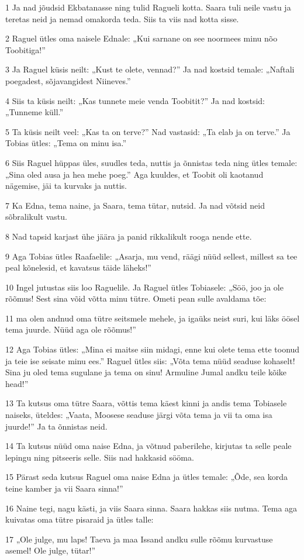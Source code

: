 \par 1 Ja nad jõudsid Ekbatanasse ning tulid Ragueli kotta. Saara tuli  neile vastu ja teretas neid ja nemad omakorda teda. Siis ta viis nad  kotta sisse.
\par 2 Raguel ütles oma naisele Ednale: „Kui sarnane on see noormees  minu nõo Toobitiga!”
\par 3 Ja Raguel küsis neilt: „Kust te olete, vennad?” Ja nad kostsid  temale: „Naftali poegadest, sõjavangidest Niineves.”
\par 4 Siis ta küsis neilt: „Kas tunnete meie venda Toobitit?” Ja nad  kostsid: „Tunneme küll.”
\par 5 Ta küsis neilt veel: „Kas ta on terve?” Nad vastasid: „Ta elab ja  on terve.” Ja Tobias ütles: „Tema on minu isa.”
\par 6 Siis Raguel hüppas üles, suudles teda, nuttis ja õnnistas teda  ning ütles temale: „Sina oled ausa ja hea mehe poeg.” Aga kuuldes, et  Toobit oli kaotanud nägemise, jäi ta kurvaks ja nuttis.
\par 7 Ka Edna, tema naine, ja Saara, tema tütar, nutsid. Ja nad võtsid  neid sõbralikult vastu.
\par 8 Nad tapsid karjast ühe jäära ja panid rikkalikult rooga nende ette.
\par 9 Aga Tobias ütles Raafaelile: „Asarja, mu vend, räägi nüüd  sellest, millest sa tee peal kõnelesid, et kavatsus täide läheks!”
\par 10 Ingel jutustas siis loo Raguelile. Ja Raguel ütles Tobiasele:  „Söö, joo ja ole rõõmus! Sest sina võid võtta minu tütre. Ometi pean  sulle avaldama tõe:
\par 11 ma olen andnud oma tütre seitsmele mehele, ja igaüks neist suri,  kui läks öösel tema juurde. Nüüd aga ole rõõmus!”
\par 12 Aga Tobias ütles: „Mina ei maitse siin midagi, enne kui olete  tema ette toonud ja teie ise seisate minu ees.” Raguel ütles siis:  „Võta tema nüüd seaduse kohaselt! Sina ju oled tema sugulane ja tema  on sinu! Armuline Jumal andku teile kõike head!”
\par 13 Ta kutsus oma tütre Saara, võttis tema käest kinni ja andis  tema Tobiasele naiseks, üteldes: „Vaata, Moosese seaduse järgi võta  tema ja vii ta oma isa juurde!” Ja ta õnnistas neid.
\par 14 Ta kutsus nüüd oma naise Edna, ja võtnud paberilehe, kirjutas ta  selle peale lepingu ning pitseeris selle. Siis nad hakkasid sööma.
\par 15 Pärast seda kutsus Raguel oma naise Edna ja ütles temale: „Õde,  sea korda teine kamber ja vii Saara sinna!”
\par 16 Naine tegi, nagu kästi, ja viis Saara sinna. Saara hakkas  siis nutma. Tema aga kuivatas oma tütre pisaraid ja ütles talle:
\par 17 „Ole julge, mu laps! Taeva ja maa Issand andku sulle rõõmu  kurvastuse asemel! Ole julge, tütar!”

